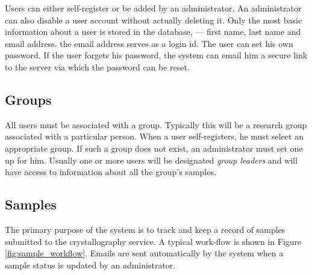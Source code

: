 \documentclass[12pt,twoside]{article}
\begin{document}
Users can either self-register or be added by an administrator.
An administrator can also disable a user account without actually
deleting it.
Only the most basic information about a user is stored in the database,
--- first name, last name and email address. the email address serves
as a login id. The user can set his own password. If the user forgets his
password, the system can email him a secure link to the server via which
the password can be reset.

\subsection{Groups}

All users must be associated with a group. Typically this will be a
research group associated with a particular person. When a user self-registers,
he must select an appropriate group. If such a group does not exist, an
administrator must set one up for him. Usually one or more users will be
designated \emph{group leaders} and will have access to information
about all the group's samples.

\subsection{Samples}

The primary purpose of the system is to track and keep a record of
samples submitted to the crystallography service. A typical work-flow is
shown in Figure \ref{fig:sample_workflow}.
Emails are sent automatically by the system when a sample status
is updated by an administrator.
\end{document}

